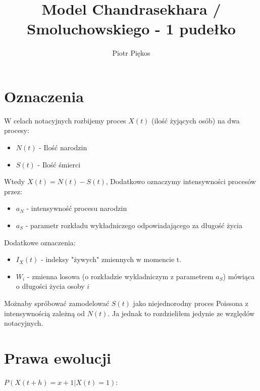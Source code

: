 \documentclass{article}
\begin{document}
\title{Model Chandrasekhara / Smoluchowskiego  - 1 pudełko}
\author{Piotr Piękos}

\maketitle

\section{Oznaczenia}
W celach notacyjnych rozbijemy proces $X(t)$ (ilość żyjących osób) na dwa procesy: 
\begin{itemize}
\item$N(t)$ - Ilość narodzin
\item$S(t)$ - Ilość śmierci
\end{itemize}
Wtedy $X(t) = N(t) - S(t)$,
Dodatkowo oznaczymy intensywności procesów przez:
\begin{itemize}
\item$a_N$ - intensywność procesu narodzin
\item$a_S$ - parametr rozkładu wykładniczego odpowiadającego za długość życia
\end{itemize}
Dodatkowe oznaczenia:
\begin{itemize}
\item$I_X(t)$ - indeksy "żywych" zmiennych w momencie t.
\item$W_i$ - zmienna losowa (o rozkładzie wykladniczym z parametrem $a_S$) mówiąca o długości życia osoby $i$
\end{itemize}

Możnaby spróbować zamodelować $S(t)$ jako niejednorodny proces Poissona z intensywnością zależną od $N(t)$. Ja jednak to rozdzieliłem jedynie ze względów notacyjnych.

\section{Prawa ewolucji}
$P(X(t+h) = x + 1 | X(t) = 1)$:
\end{document}
